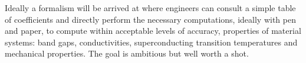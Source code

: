 
Ideally a formalism will be arrived at where engineers can consult a simple table of coefficients
and directly perform the necessary computations, ideally with pen and paper, to compute within acceptable
levels of accuracy, properties of material systems: band gaps, conductivities, superconducting 
transition temperatures and mechanical properties. The goal is ambitious but well worth a shot.

